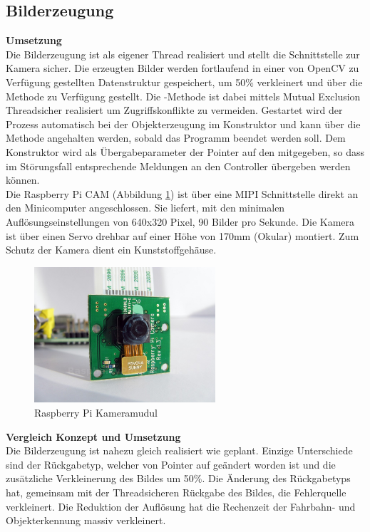 \subsection{Bilderzeugung}
\textbf{Umsetzung}\\[0.2cm]
Die Bilderzeugung ist als eigener Thread realisiert und stellt die Schnittstelle zur Kamera sicher. Die erzeugten Bilder werden fortlaufend in einer von OpenCV zu Verfügung gestellten Datenstruktur  gespeichert, um 50\% verkleinert und über die  Methode  zu Verfügung gestellt. Die -Methode ist dabei mittels Mutual Exclusion Threadsicher realisiert um Zugriffskonflikte zu vermeiden. Gestartet wird der Prozess automatisch bei der Objekterzeugung im Konstruktor und kann über die Methode  angehalten werden, sobald das Programm beendet werden soll. Dem Konstruktor wird als Übergabeparameter der Pointer auf den  mitgegeben, so dass im Störungsfall entsprechende Meldungen an den Controller übergeben werden können.\\
Die Raspberry Pi CAM (Abbildung \ref{fig:camera}) ist über eine MIPI Schnittstelle direkt an den Minicomputer angeschlossen. Sie liefert, mit den minimalen Auflösungseinstellungen von 640x320 Pixel, 90 Bilder pro Sekunde. Die Kamera ist über einen Servo drehbar auf einer Höhe von 170mm (Okular) montiert. Zum Schutz der Kamera dient ein Kunststoffgehäuse. 
\begin{figure}[H]
\centering
\includegraphics[width=0.6\textwidth]{03_Loesungskonzept/pictures/raspberry-pi-camera-module.jpg}
\caption{Raspberry Pi Kameramudul}
\label{fig:camera}
\end{figure}
\textbf{Vergleich Konzept und Umsetzung}\\[0.2cm]
Die Bilderzeugung ist nahezu gleich realisiert wie geplant. Einzige Unterschiede sind der Rückgabetyp, welcher von Pointer auf  geändert worden ist und die zusätzliche Verkleinerung des Bildes um 50\%. Die Änderung des Rückgabetyps hat, gemeinsam mit der Threadsicheren Rückgabe des Bildes, die Fehlerquelle verkleinert. Die Reduktion der Auflösung hat die Rechenzeit der Fahrbahn- und Objekterkennung massiv verkleinert.\\[0.2cm]
